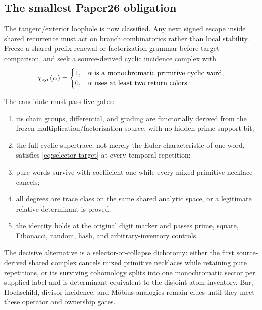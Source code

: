 \subsection{The smallest Paper26 obligation}

The tangent/exterior loophole is now classified.  Any next signed escape
inside shared recurrence must act on branch combinatorics rather than local
stability.  Freeze a shared prefix-renewal or factorization grammar before
target comparison, and seek a source-derived cyclic incidence complex with
\begin{equation}
 \chi_{\rm cyc}(\alpha)=
 \begin{cases}
 1,&\alpha\text{ is a monochromatic primitive cyclic word},\\
 0,&\alpha\text{ uses at least two return colors}.
 \end{cases}
 \label{eq:selector-target}
\end{equation}

The candidate must pass five gates:
\begin{enumerate}
  \item its chain groups, differential, and grading are functorially derived
  from the frozen multiplication/factorization source, with no hidden
  prime-support bit;
  \item the full cyclic supertrace, not merely the Euler characteristic of
  one word, satisfies \eqref{eq:selector-target} at every temporal
  repetition;
  \item pure words survive with coefficient one while every mixed primitive
  necklace cancels;
  \item all degrees are trace class on the same shared analytic space, or a
  legitimate relative determinant is proved;
  \item the identity holds at the original digit marker and passes prime,
  square, Fibonacci, random, hash, and arbitrary-inventory controls.
\end{enumerate}

The decisive alternative is a selector-or-collapse dichotomy: either the
first source-derived shared complex cancels mixed primitive necklaces while
retaining pure repetitions, or its surviving cohomology splits into one
monochromatic sector per supplied label and is determinant-equivalent to the
disjoint atom inventory.  Bar, Hochschild, divisor-incidence, and M\"obius
analogies remain clues until they meet these operator and ownership gates.

